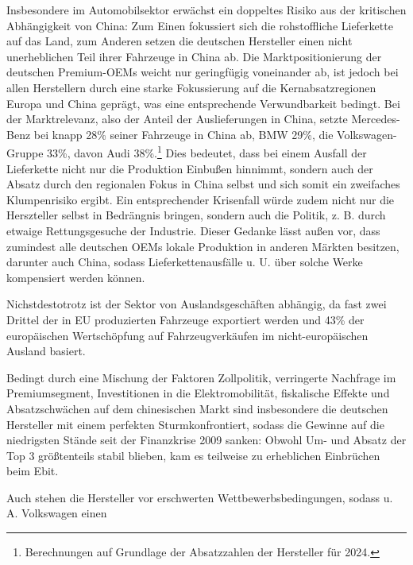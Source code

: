 \documentclass[12pt,a4paper,oneside]{book} %
\begin{document}
Insbesondere im Automobilsektor erwächst ein doppeltes Risiko aus der kritischen Abhängigkeit von China: Zum Einen fokussiert sich die rohstoffliche Lieferkette auf das Land, zum Anderen setzen die deutschen Hersteller einen nicht unerheblichen Teil ihrer Fahrzeuge in China ab. Die Marktpositionierung der deutschen Premium-OEMs weicht nur geringfügig voneinander ab, ist jedoch bei allen Herstellern durch eine starke Fokussierung auf die Kernabsatzregionen Europa und China geprägt, was eine entsprechende Verwundbarkeit bedingt.\autocite{Marktpositionierung der globalen Automobilhersteller in den Weltmärkten, Centre of Automotive Management, 16.5.2024.} Bei der Marktrelevanz, also der Anteil der Auslieferungen in China, setzte Mercedes-Benz bei knapp 28\% seiner Fahrzeuge in China ab, BMW 29\%, die Volkswagen-Gruppe 33\%, davon Audi 38\%.\footnote{Berechnungen auf Grundlage der Absatzzahlen der Hersteller für 2024.}
Dies bedeutet, dass bei einem Ausfall der Lieferkette nicht nur die Produktion Einbußen hinnimmt, sondern auch der Absatz durch den regionalen Fokus in China selbst und sich somit ein zweifaches Klumpenrisiko ergibt. Ein entsprechender Krisenfall würde zudem nicht nur die Herszteller selbst in Bedrängnis bringen, sondern auch die Politik, z. B. durch etwaige Rettungsgesuche der Industrie.\autocite{Stursberg, EuZW 2025, 704}
Dieser Gedanke lässt außen vor, dass zumindest alle deutschen OEMs lokale Produktion in anderen Märkten besitzen, darunter auch China, sodass Lieferkettenausfälle u. U. über solche Werke kompensiert werden können.

Nichstdestotrotz ist der Sektor von Auslandsgeschäften abhängig, da fast zwei Drittel der in EU produzierten Fahrzeuge exportiert werden und 43\% der europäischen Wertschöpfung auf Fahrzeugverkäufen im nicht-europäischen Ausland basiert.\autocite{2023 EU industrial R&D investment scoreboard, European Commission, 2023}

Bedingt durch eine Mischung der Faktoren Zollpolitik, verringerte Nachfrage im Premiumsegment, Investitionen in die Elektromobilität, fiskalische Effekte und Absatzschwächen auf dem chinesischen Markt sind insbesondere die deutschen Hersteller mit einem \glqq perfekten Sturm\grqq konfrontiert, sodass die Gewinne auf die niedrigsten Stände seit der Finanzkrise 2009 sanken: Obwohl Um- und Absatz der Top 3 größtenteils stabil blieben, kam es teilweise zu erheblichen Einbrüchen beim Ebit.\autocite{https://www.ey.com/de_de/newsroom/2025/12/ey-automotive-bilanzen-q3-2025}

Auch stehen die Hersteller vor erschwerten Wettbewerbsbedingungen, sodass u. A. Volkswagen einen 
\end{document}

